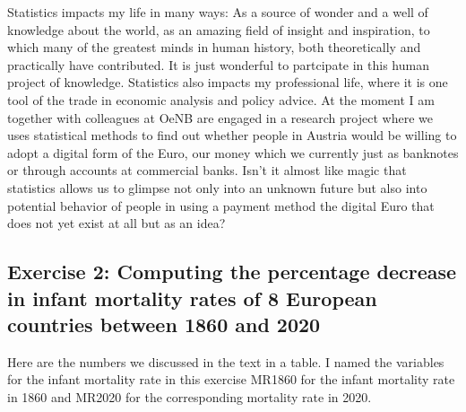 \documentclass[letterpaper,10pt,english]{jupyterBook}
\begin{document}
\sphinxAtStartPar
Statistics impacts my life in many ways: As a source of wonder and a well of knowledge about the world, as an amazing field of insight and inspiration, to which many of the greatest minds in human history, both theoretically and practically have contributed. It is just wonderful to partcipate in this human project of knowledge. Statistics also impacts my professional life, where it is one tool of the trade in economic analysis and policy advice. At the moment I am together with colleagues at OeNB are engaged in a research project where we uses statistical methods to find out whether people in Austria would be willing to adopt a digital form of the Euro, our money which we currently just as banknotes or through accounts at commercial banks. Isn’t it almost like magic that statistics allows us to glimpse not only into an unknown future but also into potential behavior of people in using a payment method \sphinxhyphen{} the digital Euro \sphinxhyphen{} that does not yet exist at all but as an idea?


\subsection{Exercise 2: Computing the percentage decrease in infant mortality rates of 8 European countries between 1860 and 2020}
\label{\detokenize{exercises_unit_1:exercise-2-computing-the-percentage-decrease-in-infant-mortality-rates-of-8-european-countries-between-1860-and-2020}}
\sphinxAtStartPar
Here are the numbers we discussed in the text in a table. I named the variables for the infant mortality rate in this exercise MR\sphinxhyphen{}1860 for  the infant mortality rate in 1860 and MR\sphinxhyphen{}2020 for the corresponding mortality rate in 2020.
\end{document}

